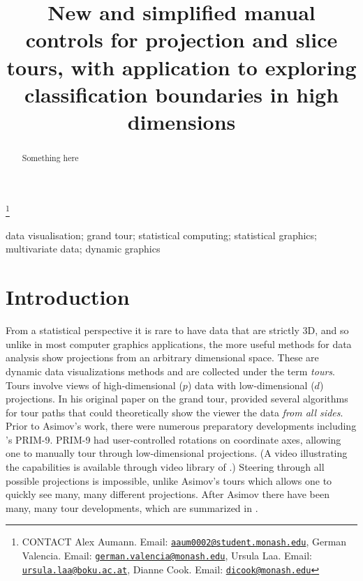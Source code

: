 \documentclass[]{interact}
\theoremstyle{plain}%
\theoremstyle{definition}
\theoremstyle{remark}
\begin{document}

\title{New and simplified manual controls for projection and slice
tours, with application to exploring classification boundaries in high
dimensions}


\author{
}

\thanks{CONTACT Alex
Aumann. Email: \href{mailto:aaum0002@student.monash.edu}{\nolinkurl{aaum0002@student.monash.edu}}, German
Valencia. Email: \href{mailto:german.valencia@monash.edu}{\nolinkurl{german.valencia@monash.edu}}, Ursula
Laa. Email: \href{mailto:ursula.laa@boku.ac.at}{\nolinkurl{ursula.laa@boku.ac.at}}, Dianne
Cook. Email: \href{mailto:dicook@monash.edu}{\nolinkurl{dicook@monash.edu}}}

\maketitle

\begin{abstract}
Something here
\end{abstract}

\begin{keywords}
data visualisation; grand tour; statistical computing; statistical
graphics; multivariate data; dynamic graphics
\end{keywords}

\hypertarget{introduction}{%
\section{Introduction}\label{introduction}}

From a statistical perspective it is rare to have data that are strictly
3D, and so unlike in most computer graphics applications, the more
useful methods for data analysis show projections from an arbitrary
dimensional space. These are dynamic data visualizations methods and are
collected under the term \emph{tours}. Tours involve views of
high-dimensional (\(p\)) data with low-dimensional (\(d\)) projections.
In his original paper on the grand tour, \citet{As85} provided several
algorithms for tour paths that could theoretically show the viewer the
data \emph{from all sides}. Prior to Asimov's work, there were numerous
preparatory developments including \citet{tukey}'s PRIM-9. PRIM-9 had
user-controlled rotations on coordinate axes, allowing one to manually
tour through low-dimensional projections. (A video illustrating the
capabilities is available through video library of \citet{ASA22}.)
Steering through all possible projections is impossible, unlike Asimov's
tours which allows one to quickly see many, many different projections.
After Asimov there have been many, many tour developments, which are
summarized in \citet{lee2021}.
\end{document}

